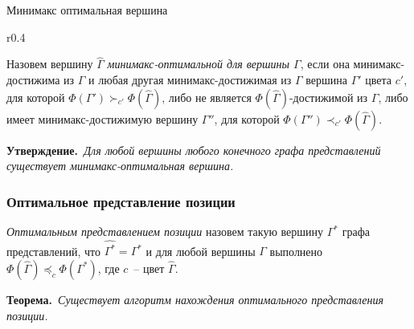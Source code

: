 \documentclass{beamer}
\begin{document}
\begin{frame}{Минимакс оптимальная вершина}
\begin{wrapfigure}[6]{r}{0.4\linewidth} 
  \vspace{-7ex}
\end{wrapfigure}  

Назовем вершину $\widehat{\Gamma}$ \textit{минимакс-оптимальной для вершины $\Gamma$}, если она минимакс-достижима из $\Gamma$ и любая другая минимакс-достижимая из $\Gamma$ вершина $\Gamma'$ цвета $c'$, для которой $\Phi(\Gamma') \succ_{c'} \Phi(\widehat{\Gamma})$, либо не является $\Phi(\widehat{\Gamma})$-достижимой из $\Gamma$, либо имеет минимакс-достижимую вершину $\Gamma''$, для которой $\Phi(\Gamma'') \prec_{c'} \Phi(\widehat{\Gamma})$.


\bigskip
{\bf Утверждение.}{\it~Для любой вершины любого конечного графа представлений существует минимакс-оптимальная вершина.}

\end{frame}


\begin{frame}\frametitle{Оптимальное представление позиции}
\bigskip
\emph{Оптимальным представлением позиции} назовем такую вершину $\Gamma^*$ графа представлений, что $\widehat{\Gamma^*}=\Gamma^*$ и  для любой вершины $\Gamma$ выполнено $\Phi(\widehat{\Gamma}) \preccurlyeq_c \Phi(\Gamma^*)$, где $c$~-- цвет $\widehat{\Gamma}$.

\bigskip
{\bf Теорема.}{\it~Существует алгоритм нахождения оптимального представления позиции.}
\end{frame}

\begin{frame}
\end{frame}
\end{document}
